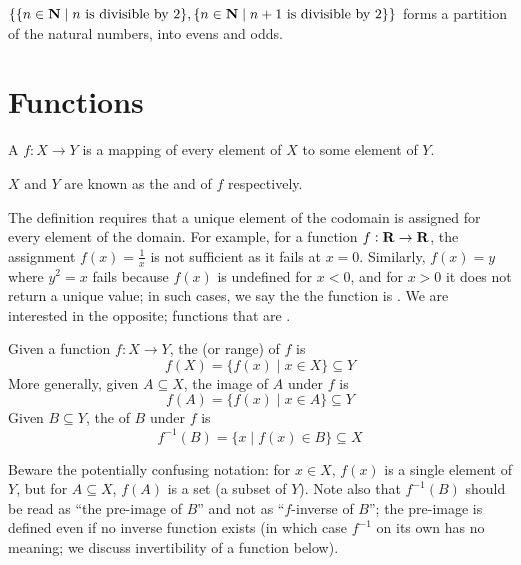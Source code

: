 \begin{example}
$\{\{n \in \mathbf N \mid n \text{ is divisible by } 2\}, \{n \in \mathbf N \mid n+1 \text{ is divisible by } 2\}\}$ forms a partition of the natural numbers, into evens and odds.
\end{example}
\pagebreak

\section{Functions}
\begin{definition}[Function]
A  $f:X\to Y$ is a mapping of every element of $X$ to some element of $Y$.

$X$ and $Y$ are known as the  and  of $f$ respectively.
\end{definition}

\begin{remark}
The definition requires that a unique element of the codomain is assigned for every element of the domain. For example, for a function $f:\mathbf R \to \mathbf R$, the assignment $f(x)=\frac{1}{x}$ is not sufficient as it fails at $x=0$. Similarly, $f(x)=y$ where $y^2=x$ fails because $f(x)$ is undefined for $x<0$, and for $x>0$ it does not return a unique value; in such cases, we say the the function is . We are interested in the opposite; functions that are .
\end{remark}

\begin{definition}
Given a function $f:X \to Y$, the  (or range) of $f$ is
\[ f(X) = \{f(x) \mid x \in X\} \subseteq Y \]
More generally, given $A \subseteq X$, the image of $A$ under $f$ is
\[ f(A) = \{f(x) \mid x \in A\} \subseteq Y \]
Given $B \subseteq Y$, the  of $B$ under $f$ is
\[ f^{-1}(B) = \{x \mid f(x) \in B\} \subseteq X \]
\end{definition}

\begin{remark}
Beware the potentially confusing notation: for $x \in X$, $f(x)$ is a single element of $Y$, but for $A \subseteq X$, $f(A)$ is a set (a subset of $Y$). Note also that $f^{-1}(B)$ should be read as ``the pre-image of $B$'' and not as ``$f$-inverse of $B$''; the pre-image is defined even if no inverse function exists (in which case $f^{-1}$ on its own has no meaning; we discuss invertibility of a function below).
\end{remark}

